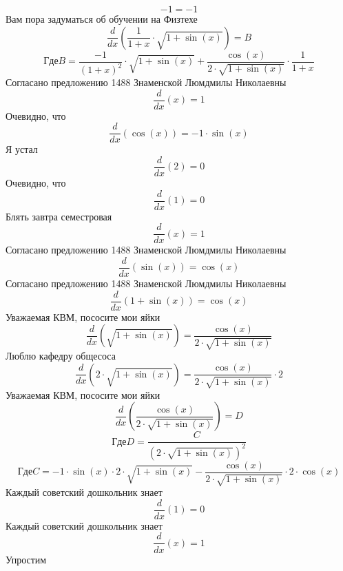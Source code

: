 \documentclass[12pt, a4paper]{article}
\begin{document}
\begin{equation}
-1 = -1
\end{equation}
Вам пора задуматься об обучении на Физтехе
\begin{equation}
\frac{d}{dx}(\frac{1}{1+x} \cdot \sqrt{1+\sin(x)}) = B
\end{equation}
$$Где B = \frac{-1}{{(1+x)}^{2}} \cdot \sqrt{1+\sin(x)}+\frac{\cos(x)}{2 \cdot \sqrt{1+\sin(x)}} \cdot \frac{1}{1+x}$$
Согласано предложению 1488 Знаменской Люмдмилы Николаевны
\begin{equation}
\frac{d}{dx}(x) = 1
\end{equation}
Очевидно, что
\begin{equation}
\frac{d}{dx}(\cos(x)) = -1 \cdot \sin(x)
\end{equation}
Я устал
\begin{equation}
\frac{d}{dx}(2) = 0
\end{equation}
Очевидно, что
\begin{equation}
\frac{d}{dx}(1) = 0
\end{equation}
Блять завтра семестровая
\begin{equation}
\frac{d}{dx}(x) = 1
\end{equation}
Согласано предложению 1488 Знаменской Люмдмилы Николаевны
\begin{equation}
\frac{d}{dx}(\sin(x)) = \cos(x)
\end{equation}
Согласано предложению 1488 Знаменской Люмдмилы Николаевны
\begin{equation}
\frac{d}{dx}(1+\sin(x)) = \cos(x)
\end{equation}
Уважаемая КВМ, пососите мои яйки
\begin{equation}
\frac{d}{dx}(\sqrt{1+\sin(x)}) = \frac{\cos(x)}{2 \cdot \sqrt{1+\sin(x)}}
\end{equation}
Люблю кафедру общесоса
\begin{equation}
\frac{d}{dx}(2 \cdot \sqrt{1+\sin(x)}) = \frac{\cos(x)}{2 \cdot \sqrt{1+\sin(x)}} \cdot 2
\end{equation}
Уважаемая КВМ, пососите мои яйки
\begin{equation}
\frac{d}{dx}(\frac{\cos(x)}{2 \cdot \sqrt{1+\sin(x)}}) = D
\end{equation}
$$Где D = \frac{C}{{(2 \cdot \sqrt{1+\sin(x)})}^{2}}$$
$$Где C = -1 \cdot \sin(x) \cdot 2 \cdot \sqrt{1+\sin(x)}-\frac{\cos(x)}{2 \cdot \sqrt{1+\sin(x)}} \cdot 2 \cdot \cos(x)$$
Каждый советский дошкольник знает
\begin{equation}
\frac{d}{dx}(1) = 0
\end{equation}
Каждый советский дошкольник знает
\begin{equation}
\frac{d}{dx}(x) = 1
\end{equation}
Упростим
\end{document}
